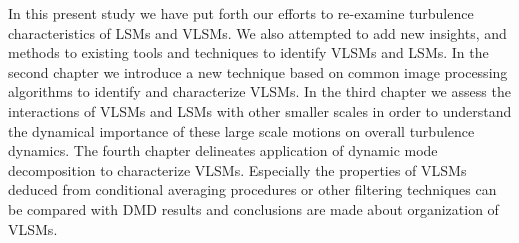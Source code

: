 In this present study we have put forth our efforts to re-examine turbulence characteristics of LSMs and VLSMs. We also attempted to add new insights, and methods to existing tools and techniques to identify VLSMs and LSMs. In the second chapter we introduce a new technique based on common image processing algorithms to identify and characterize VLSMs. In the third chapter we assess the interactions of VLSMs and LSMs with other smaller scales in order to understand the dynamical importance of these large scale motions on overall turbulence dynamics. The fourth chapter delineates application of dynamic mode decomposition to characterize VLSMs. Especially the properties of VLSMs deduced from conditional averaging procedures or other filtering techniques can be compared with DMD results and conclusions are made about organization of VLSMs. 



\clearpage